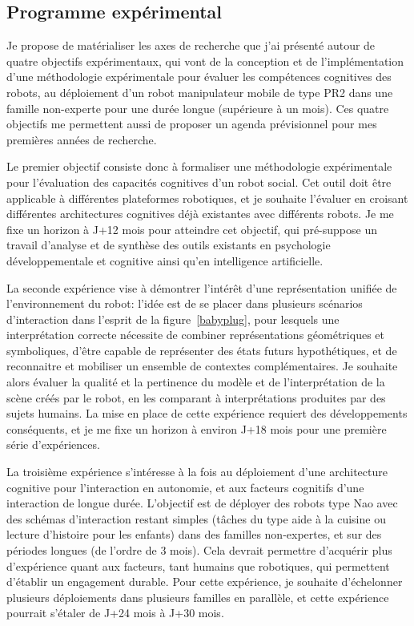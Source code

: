 \documentclass[a4paper]{article}
\begin{document}
\subsection{Programme expérimental}

Je propose de matérialiser les axes de recherche que j'ai présenté autour de
quatre objectifs expérimentaux, qui vont de la conception et de
l'implémentation d'une méthodologie expérimentale pour évaluer les compétences
cognitives des robots, au déploiement d'un robot manipulateur mobile de type
PR2 dans une famille non-experte pour une durée longue (supérieure à un mois).
Ces quatre objectifs me permettent aussi de proposer un agenda prévisionnel
pour mes premières années de recherche.

Le premier objectif consiste donc à formaliser une méthodologie expérimentale
pour l'évaluation des capacités cognitives d'un robot social. Cet outil doit
être applicable à différentes plateformes robotiques, et je souhaite l'évaluer
en croisant différentes architectures cognitives déjà existantes avec différents
robots.  Je me fixe un horizon à J+12 mois pour atteindre cet objectif, qui
pré-suppose un travail d'analyse et de synthèse des outils existants en
psychologie développementale et cognitive ainsi qu'en intelligence
artificielle.

La seconde expérience vise à démontrer l'intérêt d'une représentation unifiée de
l'environnement du robot: l'idée est de se placer dans plusieurs scénarios
d'interaction dans l'esprit de la figure~\ref{babyplug}, pour lesquels une
interprétation correcte nécessite de combiner représentations géométriques et
symboliques, d'être capable de représenter des états futurs hypothétiques, et de
reconnaitre et mobiliser un ensemble de contextes complémentaires. Je souhaite
alors évaluer la qualité et la pertinence du modèle et de l'interprétation de la
scène créés par le robot, en les comparant à interprétations produites par des
sujets humains. La mise en place de cette expérience requiert des développements
conséquents, et je me fixe un horizon à environ J+18 mois pour une première
série d'expériences.

La troisième expérience s'intéresse à la fois au déploiement d'une architecture
cognitive pour l'interaction en autonomie, et aux facteurs cognitifs d'une
interaction de longue durée. L'objectif est de déployer des robots type Nao avec
des schémas d'interaction restant simples (tâches du type aide à la cuisine ou
lecture d'histoire pour les enfants) dans des familles non-expertes, et sur des
périodes longues (de l'ordre de 3 mois). Cela devrait permettre d'acquérir plus
d'expérience quant aux facteurs, tant humains que robotiques, qui permettent
d'établir un engagement durable.  Pour cette expérience, je souhaite
d'échelonner plusieurs déploiements dans plusieurs familles en parallèle, et
cette expérience pourrait s'étaler de J+24 mois à J+30 mois.
\end{document}
